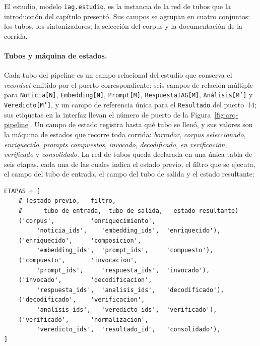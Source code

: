 \documentclass[12pt]{report}
\begin{document}
El estudio, modelo \texttt{iag.estudio}, es la instancia de la red de tubos que la introducción del capítulo presentó. Sus campos se agrupan en cuatro conjuntos: los tubos, los sintonizadores, la selección del corpus y la documentación de la corrida.

\paragraph{Tubos y máquina de estados.} Cada tubo del pipeline es un campo relacional del estudio que conserva el \textit{recordset} emitido por el puerto correspondiente: seis campos de relación múltiple para \texttt{Noticia[N]}, \texttt{Embedding[N]}, \texttt{Prompt[M]}, \texttt{RespuestaIAG[M]}, \texttt{Análisis[M']} y \texttt{Veredicto[M']}, y un campo de referencia única para el \texttt{Resultado} del puerto~14; sus etiquetas en la interfaz llevan el número de puerto de la Figura~\ref{fig:arq-pipeline}. Un campo de estado registra hasta qué tubo se llenó, y sus valores son la máquina de estados que recorre toda corrida: \textit{borrador}, \textit{corpus seleccionado}, \textit{enriquecido}, \textit{prompts compuestos}, \textit{invocado}, \textit{decodificado}, \textit{en verificación}, \textit{verificado} y \textit{consolidado}. La red de tubos queda declarada en una única tabla de seis etapas, cada una de las cuales indica el estado previo, el filtro que se ejecuta, el campo del tubo de entrada, el campo del tubo de salida y el estado resultante:

\begin{lstlisting}[style=codigoimpl]
ETAPAS = [
    # (estado previo,   filtro,
    #      tubo de entrada,  tubo de salida,   estado resultante)
    ('corpus',          'enriquecimiento',
         'noticia_ids',    'embedding_ids',  'enriquecido'),
    ('enriquecido',     'composicion',
         'embedding_ids',  'prompt_ids',     'compuesto'),
    ('compuesto',       'invocacion',
         'prompt_ids',     'respuesta_ids',  'invocado'),
    ('invocado',        'decodificacion',
         'respuesta_ids',  'analisis_ids',   'decodificado'),
    ('decodificado',    'verificacion',
         'analisis_ids',   'veredicto_ids',  'verificado'),
    ('verificado',      'normalizacion',
         'veredicto_ids',  'resultado_id',   'consolidado'),
]
\end{lstlisting}
\end{document}
